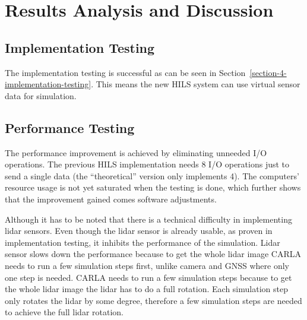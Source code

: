 \section{Results Analysis and Discussion}

\subsection{Implementation Testing}

The implementation testing is successful as can be seen in
Section~\ref{section-4-implementation-testing}. This means the new HILS system
can use virtual sensor data for simulation.

\subsection{Performance Testing}

The performance improvement is achieved by eliminating unneeded I/O operations.
The previous HILS implementation needs 8 I/O operations just to send a single
data (the ``theoretical'' version only implements 4). The computers' resource
usage is not yet saturated when the testing is done, which further shows that
the improvement gained comes software adjustments.

Although it has to be noted that there is a technical difficulty in implementing
lidar sensors. Even though the lidar sensor is already usable, as proven in
implementation testing, it inhibits the performance of the simulation. Lidar
sensor slows down the performance because to get the whole lidar image CARLA
needs to run a few simulation steps first, unlike camera and GNSS where only one
step is needed. CARLA needs to run a few simulation steps because to get the
whole lidar image the lidar has to do a full rotation. Each simulation step
only rotates the lidar by some degree, therefore a few simulation steps are
needed to achieve the full lidar rotation.